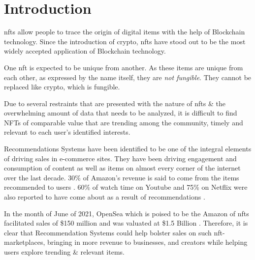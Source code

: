 \documentclass[manuscript,natbib=false]{acmart}
\begin{document}
\section{Introduction}


\gls{nft}s allow people to trace the origin of digital items with the help of Blockchain technology. Since the introduction of crypto, \gls{nft}s have stood out to be the most widely accepted application of Blockchain technology.

One \gls{nft} is expected to be unique from another. As these items are unique from each other, as expressed by the name itself, they are \textit{not fungible}. They cannot be replaced like crypto, which is fungible.

Due to several restraints that are presented with the nature of \gls{nft}s \& the overwhelming amount of data that needs to be analyzed, it is difficult to find NFTs of comparable value that are trending among the community, timely and relevant to each user’s identified interests.

Recommendations Systems have been identified to be one of the integral elements of driving sales in e-commerce sites. They have been driving engagement and consumption of content as well as items on almost every corner of the internet over the last decade. 30\% of Amazon's revenue is said to come from the items recommended to users \cite{naumovDeepLearningRecommendation2019}. 60\% of watch time on Youtube and 75\% on Netflix were also reported to have come about as a result of recommendations \cite{RecommendationsWhatWhy, vanderbiltScienceNetflixAlgorithms}.

In the month of June of 2021, OpenSea which is poised to be the Amazon of \gls{nft}s facilitated sales of \$150 million and was valuated at \$1.5 Billion \cite{hackettThisCryptoMarketplace2021, dfinzerAnnouncingOur100M2021, chevetBlockchainTechnologyNonFungible2018}. Therefore, it is clear that Recommendation Systems could help bolster sales on such \gls{nft}-marketplaces, bringing in more revenue to businesses, and creators while helping users explore trending \& relevant items.
\end{document}
